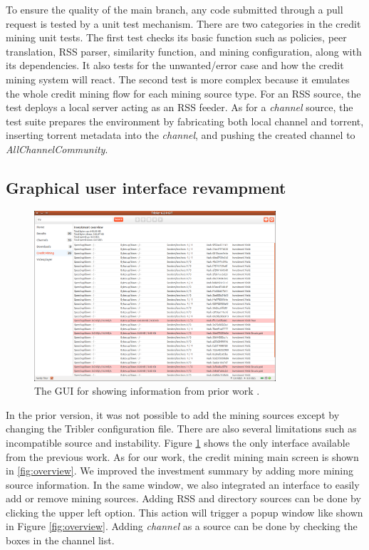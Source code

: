 To ensure the quality of the main branch, any code submitted through a pull request is tested by a unit test mechanism. There are two categories in the credit mining unit tests. The first test checks its basic function such as policies, peer translation, RSS parser, similarity function, and mining configuration, along with its dependencies. It also tests for the unwanted/error case and how the credit mining system will react. The second test is more complex because it emulates the whole credit mining flow for each mining source type. For an RSS source, the test deploys a local server acting as an RSS feeder. As for a \textit{channel} source, the test suite prepares the environment by fabricating both local channel and torrent, inserting torrent metadata into the \textit{channel}, and pushing the created channel to \textit{AllChannelCommunity}. 

\subsection{Graphical user interface revampment}
\begin{figure}[h]
	\centering
	\includegraphics[width=0.8\textwidth]{pics/old_cm.png}
	\caption{The GUI for showing information from prior work \cite{2015:creditmining:capota}.}
	\label{fig:oldcm}
\end{figure}
In the prior version, it was not possible to add the mining sources except by changing the Tribler configuration file. There are also several limitations such as incompatible source and instability. Figure \ref{fig:oldcm} shows the only interface available from the previous work. As for our work, the credit mining main screen is shown in \ref{fig:overview}. We improved the investment summary by adding more mining source information. In the same window, we also integrated an interface to easily add or remove mining sources. Adding RSS and directory sources can be done by clicking the upper left option. This action will trigger a popup window like shown in Figure \ref{fig:overview}. Adding \textit{channel} as a source can be done by checking the boxes in the channel list.

